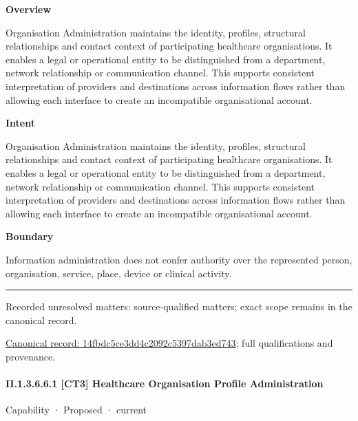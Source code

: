 \textbf{Overview}



Organisation Administration maintains the identity, profiles, structural relationships and contact context of participating healthcare organisations. It enables a legal or operational entity to be distinguished from a department, network relationship or communication channel. This supports consistent interpretation of providers and destinations across information flows rather than allowing each interface to create an incompatible organisational account.



\textbf{Intent}



Organisation Administration maintains the identity, profiles, structural relationships and contact context of participating healthcare organisations. It enables a legal or operational entity to be distinguished from a department, network relationship or communication channel. This supports consistent interpretation of providers and destinations across information flows rather than allowing each interface to create an incompatible organisational account.



\textbf{Boundary}



Information administration does not confer authority over the represented person, organisation, service, place, device or clinical activity.



\medskip\hrule\medskip

{\small Recorded unresolved matters: source-qualified matters; exact scope remains in the canonical record.}\par
{\footnotesize \href{../../../../continuum/strategy/capability/14fbdc5ce3dd4c2092c5397dab3ed743.md}{Canonical record: 14fbdc5ce3dd4c2092c5397dab3ed743}; full qualifications and provenance.}\par
\paragraph*{II.1.3.6.6.1 [CT3] Healthcare Organisation Profile Administration}
\label{navigation:II.1.3.6.6.1}

\label{element:f2de9e9394b849f2943355c7a2882a15}
{\small Capability · Proposed · current}\par

